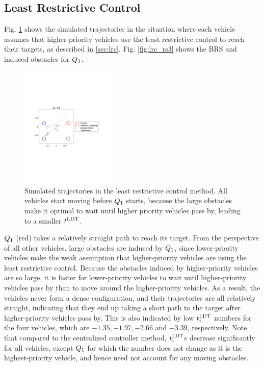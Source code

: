 \subsection{Least Restrictive Control}
Fig. \ref{fig:lrc_traj} shows the simulated trajectories in the situation where each vehicle assumes that higher-priority vehicles use the least restrictive control to reach their targets, as described in \ref{sec:lrc}. Fig. \ref{fig:lrc_rs3} shows the BRS and induced obstacles for $Q_3$.

\begin{figure}
  \centering
  \includegraphics[width=0.40\textwidth]{"fig/lrc_traj"}
  \caption{Simulated trajectories in the least restrictive control method. All vehicles start moving before $Q_1$ starts, because the large obstacles make it optimal to wait until higher priority vehicles pass by, leading to a smaller $t^\text{LDT}$. }
  \label{fig:lrc_traj}
  \vspace{-2em}
\end{figure}

$Q_1$ (red) takes a relatively straight path to reach its target. From the perspective of all other vehicles, large obstacles are induced by $Q_1$, since lower-priority vehicles make the weak assumption that higher-priority vehicles are using the least restrictive control. Because the obstacles induced by higher-priority vehicles are so large, it is faster for lower-priority vehicles to wait until higher-priority vehicles pass by than to move around the higher-priority vehicles. As a result, the vehicles never form a dense configuration, and their trajectories are all relatively straight, indicating that they end up taking a short path to the target after higher-priority vehicles pass by. This is also indicated by low $t^\text{LDT}_i$ numbers for the four vehicles, which are $-1.35, -1.97, -2.66$ and $-3.39$, respectively. Note that compared to the centralized controller method, $t^\text{LDT}_i$s decrease significantly for all vehicles, except $Q_1$ for which the number does not change as it is the highest-priority vehicle, and hence need not account for any moving obstacles. 

